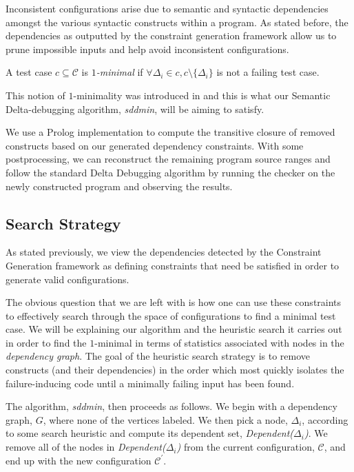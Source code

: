 \documentclass[preprint]{acm_proc_article-sp}
\newenvironment{definition}[1][Definition]{\begin{trivlist}
\item[\hskip \labelsep {\bfseries #1}]}{\end{trivlist}}
\begin{document}
Inconsistent configurations arise due to semantic and syntactic dependencies
amongst the various syntactic constructs within a program. As stated before, the
dependencies as outputted by the constraint generation framework allow us to
prune impossible inputs and help avoid inconsistent configurations.


\begin{definition}
A test case $c \subseteq \mathcal{C}$ is \emph{$1$-minimal} if $\forall \Delta_i
\in c, c \setminus \{ \Delta_i \}$ is not a failing test case.
\end{definition}

This notion of $1$-minimality was introduced in \citep{zeller99} and this is
what our Semantic Delta-debugging algorithm, \emph{sddmin}, will be aiming to
satisfy. 

We use a Prolog implementation to compute the transitive closure of removed
constructs based on our generated dependency constraints.  With some
postprocessing, we can reconstruct the remaining program source ranges and
follow the standard Delta Debugging algorithm by running the checker on the
newly constructed program and observing the results.


\subsection{Search Strategy}
\label{sddmin}

As stated previously, we view the dependencies detected by the Constraint
Generation framework as defining constraints that need be satisfied in order to
generate valid configurations.


The obvious question that we are left with is how one can use these constraints
to effectively search through the space of configurations to find a minimal test
case. We will be explaining our algorithm and the heuristic search it carries
out in order to find the $1$-minimal in terms of statistics associated with
nodes in the \emph{dependency graph}. The goal of the heuristic search strategy
is to remove constructs (and their dependencies) in the order which most quickly
isolates the failure-inducing code until a minimally failing input has been
found.


The algorithm, \emph{sddmin}, then proceeds as follows. We begin with a
dependency graph, $G$, where none of the vertices labeled. We then pick a node,
$\Delta_i$, according to some search heuristic and compute its dependent set,
\emph{Dependent($\Delta_i$)}. We remove all of the nodes in
\emph{Dependent($\Delta_i$)} from the current configuration, $\mathcal{C}$, and
end up with the new configuration $\mathcal{C}^{'}$. 
\end{document}
